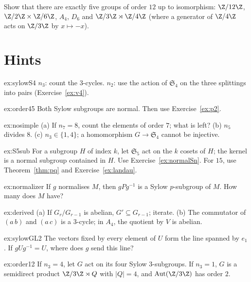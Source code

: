 \begin{exercise}[$\star\star\star$]\label{ex:order12}
Show that there are exactly five groups of order $12$ up to isomorphism: $\Z/12\Z$, $\Z/2\Z\times\Z/6\Z$, $A_4$, $D_6$ and $\Z/3\Z\rtimes\Z/4\Z$ (where a generator of $\Z/4\Z$ acts on $\Z/3\Z$ by $x\mapsto-x$).
\end{exercise}

\section{Hints}

\begin{hint}{ex:sylowS4}
$n_3$: count the $3$-cycles. $n_2$: use the action of $\mathfrak S_4$ on the three splittings into pairs (Exercise~\ref{ex:v4}).
\end{hint}
\begin{hint}{ex:order45}
Both Sylow subgroups are normal. Then use Exercise~\ref{ex:p2}.
\end{hint}
\begin{hint}{ex:nosimple}
(a) If $n_7=8$, count the elements of order $7$; what is left? (b) $n_5$ divides $8$. (c) $n_3\in\{1,4\}$; a homomorphism $G\to\mathfrak S_4$ cannot be injective.
\end{hint}
\begin{hint}{ex:S5sub}
For a subgroup $H$ of index $k$, let $\mathfrak S_5$ act on the $k$ cosets of $H$; the kernel is a normal subgroup contained in $H$. Use Exercise~\ref{ex:normalSn}. For $15$, use Theorem~\ref{thm:pq} and Exercise~\ref{ex:landau}.
\end{hint}
\begin{hint}{ex:normalizer}
If $g$ normalises $M$, then $gPg^{-1}$ is a Sylow $p$-subgroup of $M$. How many does $M$ have?
\end{hint}
\begin{hint}{ex:derived}
(a) If $G_r/G_{r-1}$ is abelian, $G'\subseteq G_{r-1}$; iterate. (b) The commutator of $(a\,b)$ and $(a\,c)$ is a $3$-cycle; in $A_4$, the quotient by $V$ is abelian.
\end{hint}
\begin{hint}{ex:sylowGL2}
The vectors fixed by every element of $U$ form the line spanned by $e_1$. If $gUg^{-1}=U$, where does $g$ send this line?
\end{hint}
\begin{hint}{ex:order12}
If $n_3=4$, let $G$ act on its four Sylow $3$-subgroups. If $n_3=1$, $G$ is a semidirect product $\Z/3\Z\rtimes Q$ with $|Q|=4$, and $\operatorname{Aut}(\Z/3\Z)$ has order $2$.
\end{hint}

